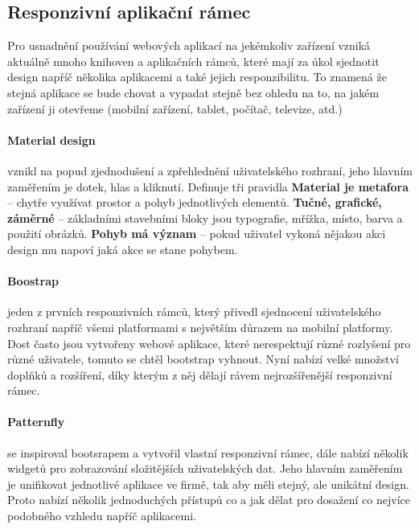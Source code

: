 \subsection{Responzivní aplikační rámec}
\par Pro usnadnění používání webových aplikací na jekémkoliv zařízení vzniká aktuálně mnoho knihoven a aplikačních rámců, které mají za úkol sjednotit design napříč několika aplikacemi a také jejich responzibilitu. To znamená že stejná aplikace se bude chovat a vypadat stejně bez ohledu na to, na jakém zařízení ji otevřeme (mobilní zařízení, tablet, počítač, televize, atd.)

\paragraph{Material design} vznikl na popud zjednodušení a zpřehlednění uživatelského rozhraní, jeho hlavním zaměřením je dotek, hlas a kliknutí. Definuje tři pravidla \textbf{Material je metafora} -- chytře využívat prostor a pohyb jednotlivých elementů. \textbf{Tučné, grafické, záměrné} -- základními stavebními bloky jsou typografie, mřížka, místo, barva a použití obrázků. \textbf{Pohyb má význam} -- pokud uživatel vykoná nějakou akci design mu napoví jaká akce se stane pohybem. \cite{material}

\paragraph{Boostrap} jeden z prvních responzivních rámců, který přivedl sjednocení uživatelského rozhraní napříč všemi platformami s největším důrazem na mobilní platformy. Dost často jsou vytvořeny webové aplikace, které nerespektují různé rozlyšení pro různé uživatele, tomuto se chtěl bootstrap vyhnout. Nyní nabízí velké množství doplňků a rozšíření, díky kterým z něj dělají rávem nejrozšířenější responzivní rámec. \cite{bootstrap}

\paragraph{Patternfly} se inspiroval bootsrapem a vytvořil vlastní responzivní rámec, dále nabízí několik widgetů pro zobrazování složitějších uživatelských dat. Jeho hlavním zaměřením je unifikovat jednotlivé aplikace ve firmě, tak aby měli stejný, ale unikátní design. Proto nabízí několik jednoduchých přístupů co a jak dělat pro dosažení co nejvíce podobného vzhledu napříč aplikacemi. \cite{patternfly}

